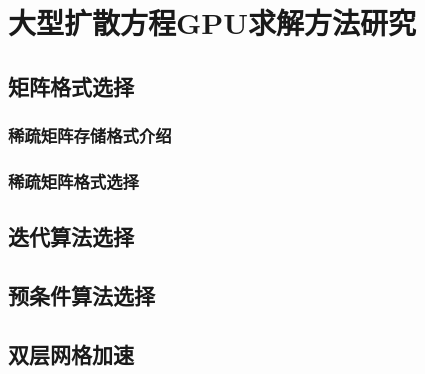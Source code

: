 

\chapter{大型扩散方程GPU求解方法研究}
\section{矩阵格式选择}
\subsection{稀疏矩阵存储格式介绍}
\subsection{稀疏矩阵格式选择}

\section{迭代算法选择}
\section{预条件算法选择}
\section{双层网格加速}
